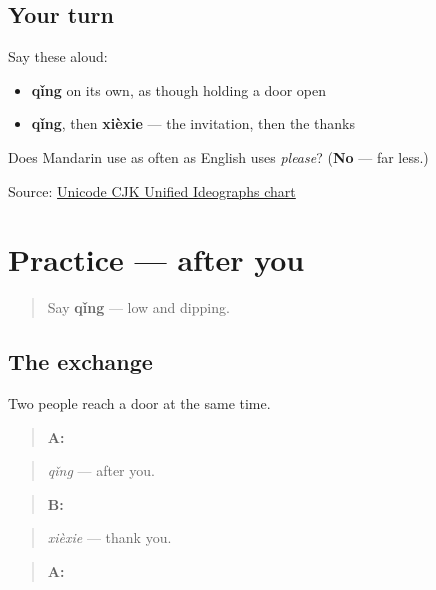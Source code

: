 \subsection*{Your turn}
Say these aloud:

\begin{itemize}
\raggedright
  \item \textbf{qǐng} on its own, as though holding a door open
  \item \textbf{qǐng}, then \textbf{xièxie} — the invitation, then the thanks
\end{itemize}

\begin{tcolorbox}[breakable,colback=teal!4,colframe=teal!35!black,title={Before you move on}]
Does Mandarin use  as often as English uses \emph{please}? (\textbf{No} — far less.)

Source: \href{https://www.unicode.org/charts/PDF/U4E00.pdf}{Unicode CJK Unified Ideographs chart}
\end{tcolorbox}
\section[Practice]{Practice — after you}

\label{lesson:ZH-C11-practice}



\begin{quote}
Say \textbf{qǐng} — low and dipping.
\end{quote}

\subsection*{The exchange}
Two people reach a door at the same time.

\begin{quote}
\textbf{A:} 
\end{quote}

\begin{quote}
\emph{qǐng} — after you.
\end{quote}

\begin{quote}
\textbf{B:} 
\end{quote}

\begin{quote}
\emph{xièxie} — thank you.
\end{quote}

\begin{quote}
\textbf{A:} 
\end{quote}

